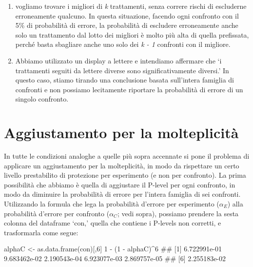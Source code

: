 \documentclass[a4paper,12pt,oneside]{book}
\providecommand{\tightlist}{%
  \setlength{\itemsep}{0pt}\setlength{\parskip}{0pt}}
\newenvironment{Shaded}{\begin{snugshade}}{\end{snugshade}}
\newcommand{\DecValTok}[1]{#1}
\newcommand{\SpecialCharTok}[1]{#1}
\newcommand{\DocumentationTok}[1]{#1}
\newcommand{\OtherTok}[1]{#1}
\newcommand{\FunctionTok}[1]{#1}
\newcommand{\NormalTok}[1]{#1}
\begin{document}
\begin{enumerate}
\def\labelenumi{\arabic{enumi}.}
\tightlist
\item
  vogliamo trovare i migliori di \emph{k} trattamenti, senza correre rischi di escluderne erroneamente qualcuno. In questa situazione, facendo ogni confronto con il 5\% di probabilità di errore, la probabilità di escludere erroneamente anche solo un trattamento dal lotto dei migliori è molto più alta di quella prefissata, perché basta sbagliare anche uno solo dei \emph{k - 1} confronti con il migliore.
\item
  Abbiamo utilizzato un display a lettere e intendiamo affermare che `i trattamenti seguiti da lettere diverse sono significativamente diversi.' In questo caso, stiamo tirando una conclusione basata sull'intera famiglia di confronti e non possiamo lecitamente riportare la probabilità di errore di un singolo confronto.
\end{enumerate}

\hypertarget{aggiustamento-per-la-molteplicituxe0}{%
\section{Aggiustamento per la molteplicità}\label{aggiustamento-per-la-molteplicituxe0}}

In tutte le condizioni analoghe a quelle più sopra accennate si pone il problema di applicare un aggiustamento per la molteplicità, in modo da rispettare un certo livello prestabilito di protezione per esperimento (e non per confronto). La prima possibilità che abbiamo è quella di aggiustare il P-level per ogni confronto, in modo da diminuire la probabilità di errore per l'intera famiglia di sei confronti. Utilizzando la formula che lega la probabilità d'errore per esperimento (\(\alpha_E\)) alla probabilità d'errore per confronto (\(\alpha_C\); vedi sopra), possiamo prendere la sesta colonna del dataframe `con,' quella che contiene i P-levels non corretti, e trasformarla come segue:

\scriptsize

\begin{Shaded}
\begin{Highlighting}[]
\NormalTok{alphaC }\OtherTok{\textless{}{-}} \FunctionTok{as.data.frame}\NormalTok{(con)[,}\DecValTok{6}\NormalTok{]}
\DecValTok{1} \SpecialCharTok{{-}}\NormalTok{ (}\DecValTok{1} \SpecialCharTok{{-}}\NormalTok{ alphaC)}\SpecialCharTok{\^{}}\DecValTok{6}
\DocumentationTok{\#\# [1] 6.722991e{-}01 9.683462e{-}02 2.190543e{-}04 6.923077e{-}03 2.869757e{-}05}
\DocumentationTok{\#\# [6] 2.255183e{-}02}
\end{Highlighting}
\end{Shaded}
\end{document}
